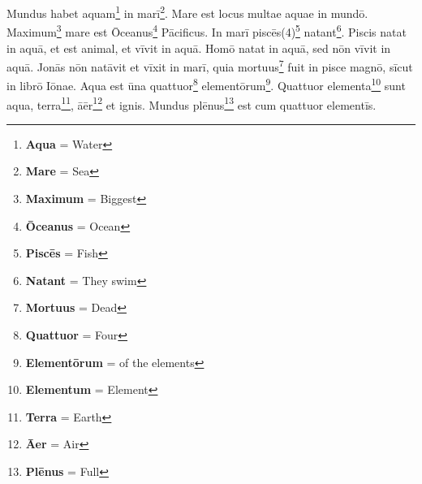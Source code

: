 Mundus habet aquam\footnote{\textbf{Aqua} = Water} in marī\footnote{\textbf{Mare} = Sea}. Mare est locus multae aquae in mundō. Maximum\footnote{\textbf{Maximum} = Biggest} mare est Ōceanus\footnote{\textbf{Ōceanus} = Ocean} Pācificus. In marī piscēs(4)\footnote{\textbf{Piscēs} = Fish} natant\footnote{\textbf{Natant} = They swim}. Piscis natat in aquā, et est animal, et vīvit in aquā. Homō natat in aquā, sed nōn vīvit in aquā. Jonās nōn natāvit et vīxit in marī, quia mortuus\footnote{\textbf{Mortuus} = Dead} fuit in pisce magnō, sīcut in librō Iōnae. Aqua est ūna quattuor\footnote{\textbf{Quattuor} = Four} elementōrum\footnote{\textbf{Elementōrum} = of the elements}. Quattuor elementa\footnote{\textbf{Elementum} = Element} sunt aqua, terra\footnote{\textbf{Terra} = Earth}, āēr\footnote{\textbf{Āer} = Air} et ignis. Mundus plēnus\footnote{\textbf{Plēnus} = Full} est cum quattuor elementīs. 